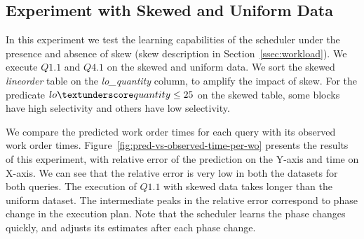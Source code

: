 \subsection{Experiment with Skewed and Uniform Data}
In this experiment we test the learning capabilities of the \sys{} scheduler under the presence and absence of skew (skew description in Section~\ref{ssec:workload}).
We execute $Q1.1$ and $Q4.1$ on the skewed and uniform data.
We sort the skewed \textit{lineorder} table on the \textit{lo\_quantity} column, to amplify the impact of skew. 
For the predicate $lo\textunderscore quantity \leq 25$ on the skewed table, some blocks have high selectivity and others have low selectivity.



We compare the predicted work order times for each query with its observed work order times. %
Figure~\ref{fig:pred-vs-observed-time-per-wo} presents the results of this experiment, with relative error of the prediction on the Y-axis and time on X-axis.
We can see that the relative error is very low in both the datasets for both queries. 
The execution of $Q1.1$ with skewed data takes longer than the uniform dataset.
The intermediate peaks in the relative error correspond to phase change in the execution plan. 
Note that the scheduler learns the phase changes quickly, and adjusts its estimates after each phase change. 

